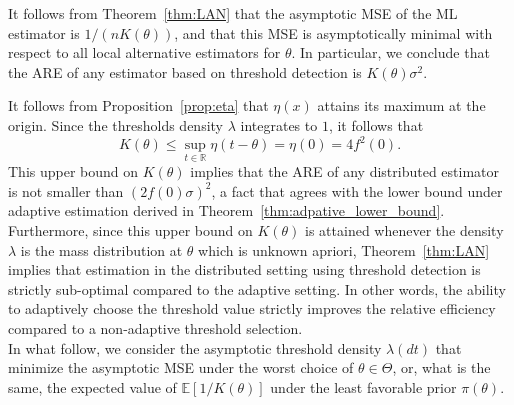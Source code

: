 \documentclass[letterpaper, conference, 11pt]{IEEEtran}      %
\begin{document}
It follows from Theorem~\ref{thm:LAN} that the asymptotic MSE of the ML estimator is $1/(nK(\theta))$, and that this MSE is asymptotically minimal with respect to all local alternative estimators for $\theta$. In particular, we conclude that the ARE of any estimator based on threshold detection is $K(\theta)\sigma^2$. \par
It follows from Proposition~\ref{prop:eta} that $\eta(x)$ attains its maximum at the origin. Since the thresholds density $\lambda$ integrates to $1$, it follows that
\[
K(\theta) \leq \sup_{t\in \mathbb R} \eta \left( t-\theta\right)  = \eta(0) = 4f^2(0).
\]
This upper bound on $K(\theta)$ implies that the ARE of any distributed estimator is not smaller than $(2f(0)\sigma)^2$, a fact that agrees with the lower bound under adaptive estimation derived in Theorem~\ref{thm:adpative_lower_bound}. Furthermore, 
since this upper bound on $K(\theta)$ is attained whenever the density $\lambda$ is the mass distribution at $\theta$ which is unknown apriori, Theorem~\ref{thm:LAN} implies that estimation in the  distributed setting using threshold detection is strictly sub-optimal compared to the adaptive setting. In other words, the ability to adaptively choose the threshold value strictly improves the relative efficiency compared to a non-adaptive threshold selection. \\

In what follow, we consider the asymptotic threshold density $\lambda(dt)$ that minimize the asymptotic MSE under the worst choice of $\theta \in \Theta$, or, what is the same, the expected value of $\mathbb E\left [1/K(\theta) \right]$ under the least favorable prior $\pi(\theta)$. 
\end{document}
